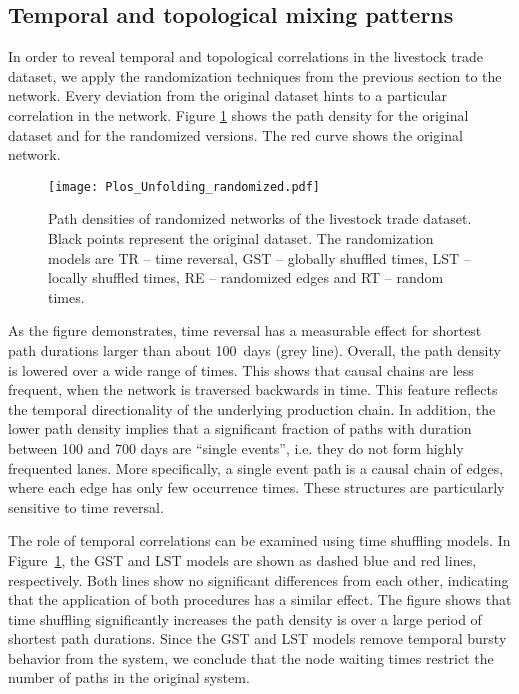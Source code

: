 \subsection{Temporal and topological mixing patterns}\label{sec:mixing_hit}
In order to reveal temporal and topological correlations in the livestock trade dataset, we apply the randomization techniques from the previous section to the network.
Every deviation from the original dataset hints to a particular correlation in the network.
Figure \ref{fig:randomized_hit} shows the path density for the original dataset and for the randomized versions.
The red curve shows the original network.
\begin{figure}[htb]
\begin{center}
\texttt{[image: Plos\_Unfolding\_randomized.pdf]}
\caption{Path densities of randomized networks of the livestock trade dataset.
Black points represent the original dataset.
The randomization models are TR -- time reversal, GST -- globally shuffled times, LST -- locally shuffled times, RE -- randomized edges and RT -- random times.
}
\label{fig:randomized_hit}
\end{center}
\end{figure}

As the figure demonstrates, time reversal has a measurable effect for shortest path durations larger than about 100~days (grey line).
Overall, the path density is lowered over a wide range of times.
This shows that causal chains are less frequent, when the network is traversed backwards in time.
This feature reflects the temporal directionality of the underlying production chain.
In addition, the lower path density implies that a significant fraction of paths with duration between 100 and 700 days are ``single events'', i.e. they do not form highly frequented lanes.
More specifically, a single event path is a causal chain of edges, where each edge has only few occurrence times.
These structures are particularly sensitive to time reversal. 

The role of temporal correlations can be examined using time shuffling models.
In Figure~\ref{fig:randomized_hit}, the GST and LST models are shown as dashed blue and red lines, respectively.
Both lines show no significant differences from each other, indicating that the application of both procedures has a similar effect.
The figure shows that time shuffling significantly increases the path density is over a large period of shortest path durations.
Since the GST and LST models remove temporal bursty behavior from the system, we conclude that the node waiting times restrict the number of paths in the original system. 

